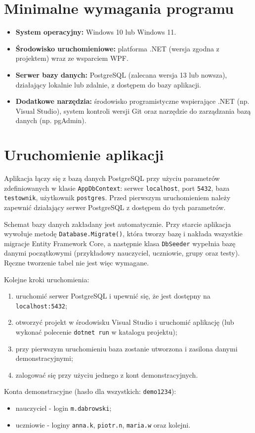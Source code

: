 
\section{Minimalne wymagania programu}
\label{sec:wymaganiaMin}

\begin{itemize}
  \item \textbf{System operacyjny:} Windows 10 lub Windows 11.
  \item \textbf{Środowisko uruchomieniowe:} platforma .NET (wersja zgodna z projektem) wraz
        ze wsparciem WPF.
  \item \textbf{Serwer bazy danych:} PostgreSQL (zalecana wersja 13 lub nowsza), działający lokalnie
        lub zdalnie, z dostępem do bazy aplikacji.
  \item \textbf{Dodatkowe narzędzia:} środowisko programistyczne wspierające .NET (np. Visual
        Studio), system kontroli wersji Git oraz narzędzie do zarządzania bazą danych (np. pgAdmin).
\end{itemize}

\section{Uruchomienie aplikacji}
\label{sec:uruchomienie}

Aplikacja łączy się z bazą danych PostgreSQL przy użyciu parametrów zdefiniowanych w klasie
\texttt{AppDbContext}: serwer \texttt{localhost}, port \texttt{5432}, baza \texttt{testownik},
użytkownik \texttt{postgres}. Przed pierwszym uruchomieniem należy zapewnić działający serwer
PostgreSQL z dostępem do tych parametrów.

Schemat bazy danych zakładany jest automatycznie. Przy starcie aplikacja wywołuje metodę
\texttt{Database.Migrate()}, która tworzy bazę i nakłada wszystkie migracje Entity Framework Core,
a następnie klasa \texttt{DbSeeder} wypełnia bazę danymi początkowymi (przykładowy nauczyciel,
uczniowie, grupy oraz testy). Ręczne tworzenie tabel nie jest więc wymagane.

Kolejne kroki uruchomienia:
\begin{enumerate}
  \item uruchomić serwer PostgreSQL i upewnić się, że jest dostępny na \texttt{localhost:5432};
  \item otworzyć projekt w środowisku Visual Studio i uruchomić aplikację (lub wykonać polecenie
        \texttt{dotnet run} w katalogu projektu);
  \item przy pierwszym uruchomieniu baza zostanie utworzona i zasilona danymi demonstracyjnymi;
  \item zalogować się przy użyciu jednego z kont demonstracyjnych.
\end{enumerate}

Konta demonstracyjne (hasło dla wszystkich: \texttt{demo1234}):
\begin{itemize}
  \item nauczyciel - login \texttt{m.dabrowski};
  \item uczniowie - loginy \texttt{anna.k}, \texttt{piotr.n}, \texttt{maria.w} oraz kolejni.
\end{itemize}
